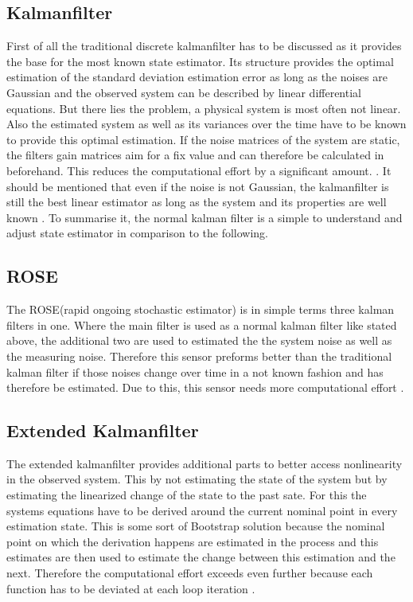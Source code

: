   \subsection{Kalmanfilter}
  First of all the traditional discrete kalmanfilter has to be discussed as it provides the base for the most known state estimator.
  Its structure provides the optimal estimation of the standard deviation estimation error as long as the noises are Gaussian
  and the observed system can be described by linear differential equations.
  But there lies the problem, a physical system is most often not linear.
  Also the estimated system as well as its variances over the time have to be known to provide this optimal estimation.
  If the noise matrices of the system are static, the filters gain matrices aim for a fix value and can therefore be calculated in beforehand.
  This reduces the computational effort by a significant amount. \cite{DavidWSchultz2004}.
  It should be mentioned that even if the noise is not Gaussian, the kalmanfilter is still the best
  linear estimator as long as the system and its properties are well known \cite{SimonDan2006Ose:}.
  To summarise it, the normal kalman filter is a simple to understand and adjust state estimator in comparison to the following.
  
  \subsection{ROSE}
  The ROSE(rapid ongoing stochastic estimator) is in simple terms three kalman filters in one.
  Where the main filter is used as a normal kalman filter like stated above, the additional two are used to estimated the 
  the system noise as well as the measuring noise. Therefore this sensor preforms better than the traditional kalman filter
  if those noises change over time in a not known fashion and has therefore be estimated.
  Due to this, this sensor needs more computational effort \cite{DavidWSchultz2004}. 
  
  \subsection{Extended Kalmanfilter}
  The extended kalmanfilter provides additional parts to better access nonlinearity in the observed system.
  This by not estimating the state of the system but by estimating the linearized change of the state 
  to the past sate. For this the systems equations have to be derived around the current nominal point in every estimation state.
  This is some sort of Bootstrap solution because the nominal point on which the derivation happens are estimated in the process and
  this estimates are then used to estimate the change between this estimation and the next.
  Therefore the computational effort exceeds even further because each function has to be deviated at each loop iteration \cite{SimonDan2006Ose:}.
  
